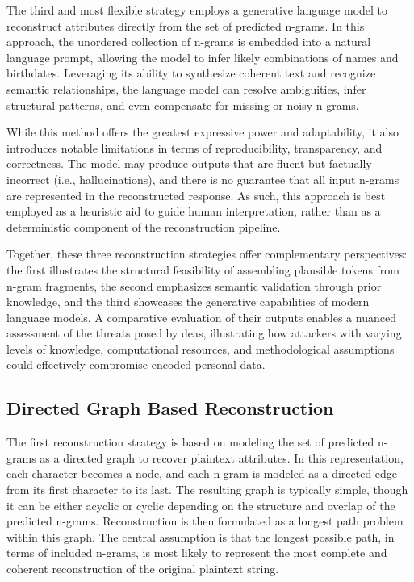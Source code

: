 The third and most flexible strategy employs a generative language model to reconstruct attributes directly from the set of predicted n-grams.
In this approach, the unordered collection of n-grams is embedded into a natural language prompt, allowing the model to infer likely combinations of names and birthdates.
Leveraging its ability to synthesize coherent text and recognize semantic relationships, the language model can resolve ambiguities, infer structural patterns, and even compensate for missing or noisy n-grams.

While this method offers the greatest expressive power and adaptability, it also introduces notable limitations in terms of reproducibility, transparency, and correctness.
The model may produce outputs that are fluent but factually incorrect (i.e., hallucinations), and there is no guarantee that all input n-grams are represented in the reconstructed response.
As such, this approach is best employed as a heuristic aid to guide human interpretation, rather than as a deterministic component of the reconstruction pipeline.

Together, these three reconstruction strategies offer complementary perspectives: the first illustrates the structural feasibility of assembling plausible tokens from n-gram fragments, the second emphasizes semantic validation through prior knowledge, and the third showcases the generative capabilities of modern language models.
A comparative evaluation of their outputs enables a nuanced assessment of the threats posed by \ac{dea}s, illustrating how attackers with varying levels of knowledge, computational resources, and methodological assumptions could effectively compromise encoded personal data.

\subsection{Directed Graph Based Reconstruction} \label{sec:graphrecon}

The first reconstruction strategy is based on modeling the set of predicted n-grams as a directed graph to recover plaintext attributes.
In this representation, each character becomes a node, and each n-gram is modeled as a directed edge from its first character to its last.
The resulting graph is typically simple, though it can be either acyclic or cyclic depending on the structure and overlap of the predicted n-grams.
Reconstruction is then formulated as a longest path problem within this graph.
The central assumption is that the longest possible path, in terms of included n-grams, is most likely to represent the most complete and coherent reconstruction of the original plaintext string.

